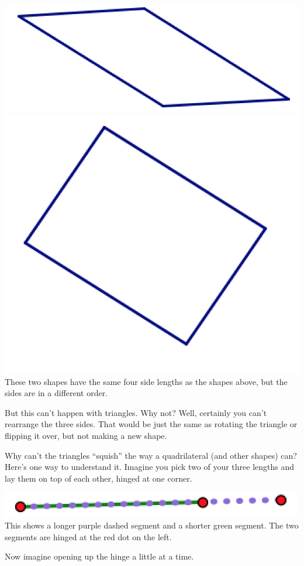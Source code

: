\documentclass[12pt, reqno]{amsart}
\theoremstyle{remark}
\theoremstyle{definition}
\numberwithin{equation}{section}  %
\begin{document}
\begin{center}
\bigskip
\includegraphics[scale = .45]{pgram1}
\qquad
\includegraphics[scale = .45]{pgram2}\\
These two shapes have the same four side lengths as the shapes above, but the sides are in a different order.
\end{center}

\bigskip

But this can't happen with triangles.  Why not?  Well, certainly you can't rearrange the three sides.  That would be just the same as rotating the triangle or flipping it over, but not making a new shape.

Why can't the triangles ``squish'' the way a quadrilateral (and other shapes) can?  Here's one way to understand it.  Imagine you pick two of your three lengths and lay them on top of each other, hinged at one corner.



\begin{center}
\includegraphics[scale = .4]{hinge}\\
 This shows a longer purple dashed segment and a shorter green segment.  The two segments are hinged at the red dot on the left.
\end{center}
Now imagine opening up the hinge a little at a time.
\end{document}

